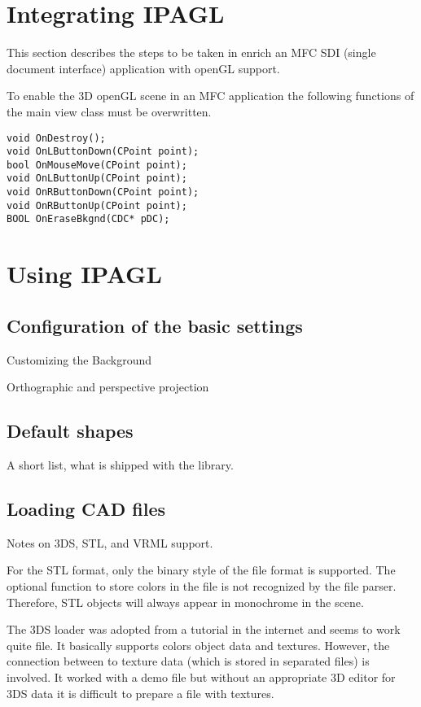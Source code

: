 \documentclass[11pt,a4paper,onepage,openany]{book}
\begin{document}
\section{Integrating IPAGL}
This section describes the steps to be taken in enrich an MFC SDI (single
document interface) application with openGL support.

To enable the 3D openGL scene in an MFC application the following functions of
the main view class must be overwritten.
\begin{verbatim}
void OnDestroy();
void OnLButtonDown(CPoint point);
bool OnMouseMove(CPoint point);
void OnLButtonUp(CPoint point);
void OnRButtonDown(CPoint point);
void OnRButtonUp(CPoint point);
BOOL OnEraseBkgnd(CDC* pDC);
\end{verbatim}

\section{Using IPAGL}
\subsection{Configuration of the basic settings}
Customizing the Background

Orthographic and perspective projection

\subsection{Default shapes}
A short list, what is shipped with the library.

\subsection{Loading CAD files}
Notes on 3DS, STL, and VRML support.

For the STL format, only the binary style of the file format is supported. The
optional function to store colors in the file is not recognized by the file
parser. Therefore, STL objects will always appear in monochrome in the scene.

The 3DS loader was adopted from a tutorial in the internet and seems to work
quite file. It basically supports colors object data and textures. However, the
connection between to texture data (which is stored in separated files) is
involved. It worked with a demo file but without an appropriate 3D editor for
3DS data it is difficult to prepare a file with textures.
\end{document}
